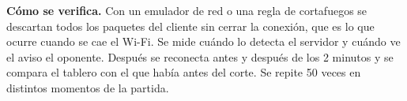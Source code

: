 \textbf{Cómo se verifica.} Con un emulador de red o una regla de cortafuegos se descartan todos los paquetes del cliente sin cerrar la conexión, que es lo que ocurre cuando se cae el Wi-Fi. Se mide cuándo lo detecta el servidor y cuándo ve el aviso el oponente. Después se reconecta antes y después de los 2 minutos y se compara el tablero con el que había antes del corte. Se repite 50 veces en distintos momentos de la partida.
